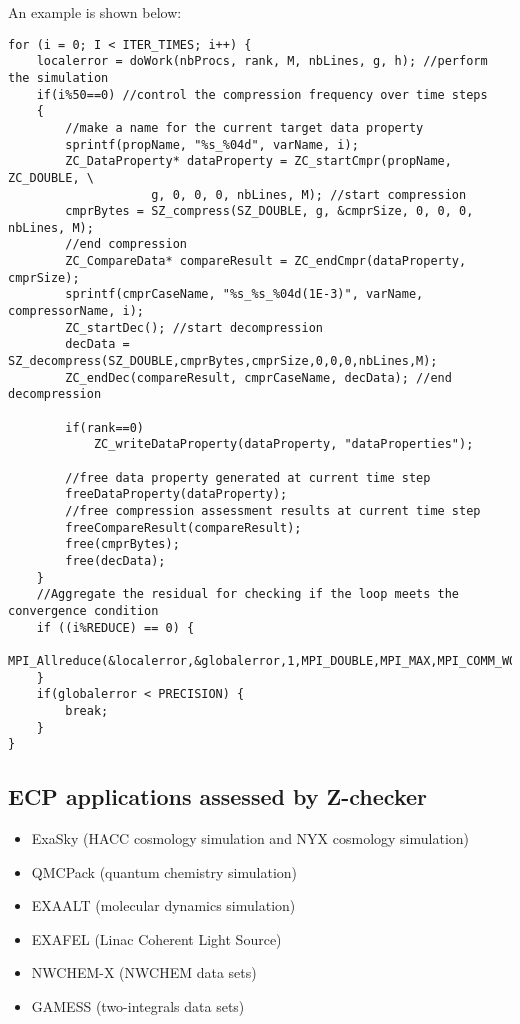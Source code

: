 An example is shown below:
\begin{lstlisting}[style=CStyle, basicstyle = \footnotesize\ttfamily]
for (i = 0; I < ITER_TIMES; i++) {
    localerror = doWork(nbProcs, rank, M, nbLines, g, h); //perform the simulation
    if(i%50==0) //control the compression frequency over time steps
    {
        //make a name for the current target data property
    	sprintf(propName, "%s_%04d", varName, i);
    	ZC_DataProperty* dataProperty = ZC_startCmpr(propName, ZC_DOUBLE, \
                    g, 0, 0, 0, nbLines, M); //start compression
    	cmprBytes = SZ_compress(SZ_DOUBLE, g, &cmprSize, 0, 0, 0, nbLines, M);
        //end compression
    	ZC_CompareData* compareResult = ZC_endCmpr(dataProperty, cmprSize);
    	sprintf(cmprCaseName, "%s_%s_%04d(1E-3)", varName, compressorName, i);
    	ZC_startDec(); //start decompression
    	decData = SZ_decompress(SZ_DOUBLE,cmprBytes,cmprSize,0,0,0,nbLines,M);	
    	ZC_endDec(compareResult, cmprCaseName, decData); //end decompression			

    	if(rank==0)
    		ZC_writeDataProperty(dataProperty, "dataProperties");
    	
        //free data property generated at current time step		
    	freeDataProperty(dataProperty);
        //free compression assessment results at current time step
    	freeCompareResult(compareResult);
    	free(cmprBytes);
    	free(decData);
    }
    //Aggregate the residual for checking if the loop meets the convergence condition
    if ((i%REDUCE) == 0) {
    	MPI_Allreduce(&localerror,&globalerror,1,MPI_DOUBLE,MPI_MAX,MPI_COMM_WORLD);
    }
    if(globalerror < PRECISION) {
    	break;
    }
}

\end{lstlisting}

\subsection{ECP applications assessed by Z-checker}

\begin{itemize}
  \item ExaSky (HACC cosmology simulation and NYX cosmology simulation)
  \item QMCPack (quantum chemistry simulation)
  \item EXAALT (molecular dynamics simulation)
  \item EXAFEL (Linac Coherent Light Source)
  \item NWCHEM-X (NWCHEM data sets)
  \item GAMESS (two-integrals data sets)
\end{itemize}


